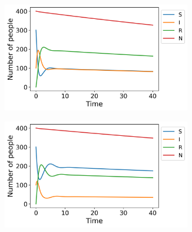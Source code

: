\documentclass[../main.tex]{subfiles}
\begin{document}
\begin{figure}[htb!]
    \centering
    \begin{subfigure}[b]{0.475\textwidth}
    \centering
    \includegraphics[width=0.9\textwidth]{../figures/SIRS_vital_rk4_b=1.png}
    \caption{}
    \label{fig:vital_b=1}
    \end{subfigure}
    \quad
    \begin{subfigure}[b]{0.475\textwidth}
    \includegraphics[width=0.9\textwidth]{../figures/SIRS_vital_rk4_b=2.png}
    \caption{}
    \label{fig:vital_b=2}
    \end{subfigure}
    

\end{figure}
\end{document}
